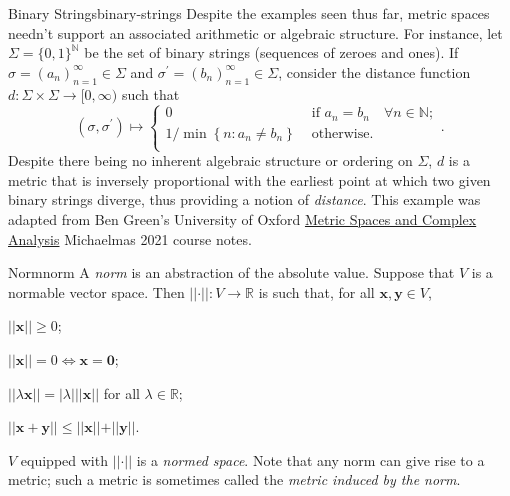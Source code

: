 \documentclass{article}
\renewcommand*\vec{\mathbf}
\numberwithin{equation}{section}
\numberwithin{figure}{section}
\newcommand*\setaxiomprefix[1]{
    \setlist[axioms]{label=#1\arabic*), ref=#1\arabic*}
}
\begin{document}
\begin{example}{Binary Strings}{binary-strings}
    Despite the examples seen thus far, metric spaces needn't support an
    associated arithmetic or algebraic structure. For instance, let $ \Sigma =
    \{ 0, 1 \}^\mathbb{N} $ be the set of binary strings (sequences of zeroes
    and ones). If $ \sigma = \left(a_n\right)_{n=1}^\infty \in \Sigma $ and $
    \sigma^\prime = \left(b_n\right)_{n=1}^\infty \in \Sigma $, consider the
    distance function $ d \colon \Sigma \times \Sigma \to [0, \infty) $ such
    that
    \begin{equation}
        \left(\sigma, \sigma^\prime\right) \mapsto
        \begin{cases}
            0 &\text{ if } a_n = b_n \quad \forall n \in \mathbb{N}; \\
            1/\min\left\{n \colon a_n \neq b_n\right\} &\text{ otherwise.} \\
        \end{cases}.
    \end{equation}
    Despite there being no inherent algebraic structure or ordering on $ \Sigma
    $, $ d $ is a metric that is inversely proportional with the earliest point
    at which two given binary strings diverge, thus providing a notion of
    \emph{distance}.
    \tcblower
    This example was adapted from Ben Green's University of Oxford
    \href{https://courses.maths.ox.ac.uk/course/view.php?id=65}{Metric Spaces
    and Complex Analysis} Michaelmas 2021 course notes.
\end{example}
\begin{definition}{Norm}{norm}
    A \emph{norm} is an abstraction of the absolute value. Suppose that $ V $ is
    a normable vector space. Then $ \vert\vert\cdot\vert\vert \colon V \to
    \mathbb{R} $ is such that, for all $ \vec{x}, \vec{y} \in V $,
    \setaxiomprefix{N}
    \begin{axioms}
        \item $ \vert\vert \vec{x} \vert\vert \geq 0 $;
        \item $ \vert\vert \vec{x} \vert\vert = 0 \iff \vec{x} = \vec{0} $;
        \item $ \vert\vert \lambda \vec{x} \vert\vert = \vert \lambda \vert
            \vert\vert \vec{x} \vert\vert $ for all $ \lambda \in \mathbb{R} $;
        \item $ \vert\vert \vec{x} + \vec{y} \vert\vert \leq \vert\vert \vec{x}
            \vert\vert + \vert\vert \vec{y} \vert\vert $.
    \end{axioms}
    $ V $ equipped with $ \vert\vert \cdot \vert\vert $ is a \emph{normed
    space}. Note that any norm can give rise to a metric; such a metric is
    sometimes called the \emph{metric induced by the norm}.
\end{definition}
\end{document}
